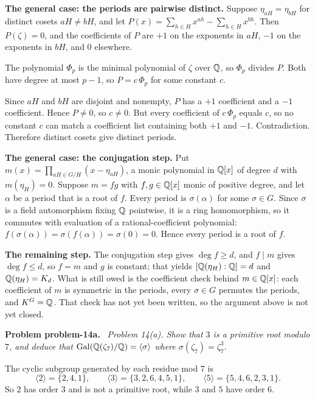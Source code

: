 \documentclass[11pt]{article}
\newenvironment{problem}[1]
  {\par\medskip\noindent\textbf{Problem #1.}\ \itshape}
  {\par\medskip}
\begin{document}
\textbf{The general case: the periods are pairwise distinct.} Suppose $\eta_{aH}=\eta_{bH}$ for distinct cosets $aH\ne bH$, and let $P(x)=\sum_{h\in H}x^{ah}-\sum_{h\in H}x^{bh}$. Then $P(\zeta)=0$, and the coefficients of $P$ are $+1$ on the exponents in $aH$, $-1$ on the exponents in $bH$, and $0$ elsewhere.

The polynomial $\Phi_p$ is the minimal polynomial of $\zeta$ over $\mathbb{Q}$, so $\Phi_p$ divides $P$. Both have degree at most $p-1$, so $P=c\,\Phi_p$ for some constant $c$.

Since $aH$ and $bH$ are disjoint and nonempty, $P$ has a $+1$ coefficient and a $-1$ coefficient. Hence $P\ne0$, so $c\ne0$. But every coefficient of $c\,\Phi_p$ equals $c$, so no constant $c$ can match a coefficient list containing both $+1$ and $-1$. Contradiction. Therefore distinct cosets give distinct periods.

\textbf{The general case: the conjugation step.} Put $m(x)=\prod_{aH\in G/H}(x-\eta_{aH})$, a monic polynomial in $\mathbb{Q}[x]$ of degree $d$ with $m(\eta_H)=0$. Suppose $m=fg$ with $f,g\in\mathbb{Q}[x]$ monic of positive degree, and let $\alpha$ be a period that is a root of $f$. Every period is $\sigma(\alpha)$ for some $\sigma\in G$. Since $\sigma$ is a field automorphism fixing $\mathbb{Q}$ pointwise, it is a ring homomorphism, so it commutes with evaluation of a rational-coefficient polynomial: $f(\sigma(\alpha))=\sigma(f(\alpha))=\sigma(0)=0$. Hence every period is a root of $f$.

\textbf{The remaining step.} The conjugation step gives $\deg f\ge d$, and $f\mid m$ gives $\deg f\le d$, so $f=m$ and $g$ is constant; that yields $[\mathbb{Q}(\eta_H):\mathbb{Q}]=d$ and $\mathbb{Q}(\eta_H)=K_d$. What is still owed is the coefficient check behind $m\in\mathbb{Q}[x]$: each coefficient of $m$ is symmetric in the periods, every $\sigma\in G$ permutes the periods, and $K^G=\mathbb{Q}$. That check has not yet been written, so the argument above is not yet closed.

\begin{problem}{problem-14a}
Problem 14(a). Show that $3$ is a primitive root modulo $7$, and deduce that $\operatorname{Gal}(\mathbb{Q}(\zeta_7)/\mathbb{Q})=\langle\sigma\rangle$ where $\sigma(\zeta_7)=\zeta_7^{3}$.
\end{problem}
The cyclic subgroup generated by each residue mod $7$ is
\[
\langle 2\rangle=\{2,4,1\},\qquad \langle 3\rangle=\{3,2,6,4,5,1\},\qquad \langle 5\rangle=\{5,4,6,2,3,1\}.
\]
So $2$ has order $3$ and is not a primitive root, while $3$ and $5$ have order $6$.
\end{document}
